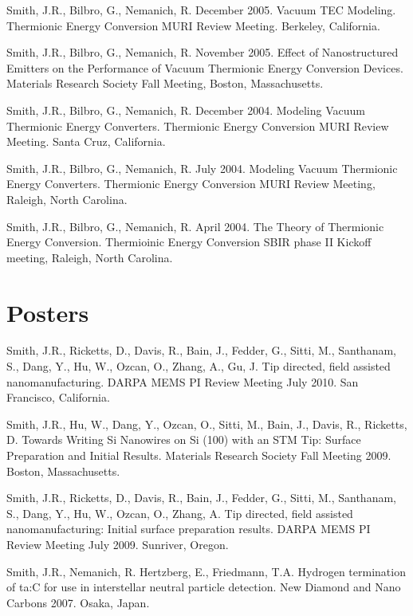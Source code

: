 \documentclass[letterpaper,margin,line]{res}
\begin{document}
\begin{resume}
Smith, J.R., Bilbro, G., Nemanich, R. December 2005. Vacuum TEC Modeling. Thermionic Energy Conversion MURI Review Meeting. Berkeley, California.

Smith, J.R., Bilbro, G., Nemanich, R. November 2005. Effect of Nanostructured Emitters on the Performance of Vacuum Thermionic Energy Conversion Devices. Materials Research Society Fall Meeting, Boston, Massachusetts.

Smith, J.R., Bilbro, G., Nemanich, R. December 2004. Modeling Vacuum Thermionic Energy Converters. Thermionic Energy Conversion MURI Review Meeting. Santa Cruz, California.

Smith, J.R., Bilbro, G., Nemanich, R. July 2004. Modeling Vacuum Thermionic Energy Converters. Thermionic Energy Conversion MURI Review Meeting, Raleigh, North Carolina.

Smith, J.R., Bilbro, G., Nemanich, R. April 2004. The Theory of Thermionic Energy Conversion. Thermioinic Energy Conversion SBIR phase II Kickoff meeting, Raleigh, North Carolina.

% 


\section{\sc Posters}
Smith, J.R., Ricketts, D., Davis, R., Bain, J., Fedder, G., Sitti, M., Santhanam, S., Dang, Y., Hu, W., Ozcan, O., Zhang, A., Gu, J. Tip directed, field assisted nanomanufacturing. DARPA MEMS PI Review Meeting July 2010. San Francisco, California.

Smith, J.R., Hu, W., Dang, Y., Ozcan, O., Sitti, M., Bain, J., Davis, R., Ricketts, D. Towards Writing Si Nanowires on Si (100) with an STM Tip: Surface Preparation and Initial Results. Materials Research Society Fall Meeting 2009. Boston, Massachusetts.

Smith, J.R., Ricketts, D., Davis, R., Bain, J., Fedder, G., Sitti, M., Santhanam, S., Dang, Y., Hu, W., Ozcan, O., Zhang, A. Tip directed, field assisted nanomanufacturing: Initial surface preparation results. DARPA MEMS PI Review Meeting July 2009. Sunriver, Oregon.

Smith, J.R., Nemanich, R. Hertzberg, E., Friedmann, T.A. Hydrogen termination of ta:C for use in interstellar neutral particle detection. New Diamond and Nano Carbons 2007. Osaka, Japan.


\end{resume}
\end{document}
